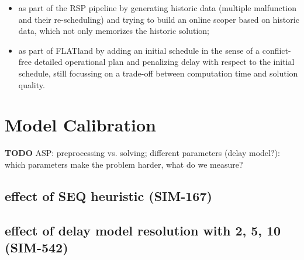 \documentclass{article}
\begin{document}
\begin{description}
\begin{itemize}
\item as part of the RSP pipeline by generating historic data (multiple malfunction and their re-scheduling) and trying to build an online scoper based on historic data, which not only memorizes the historic solution;
\item as part of FLATland by adding an initial schedule in the sense of a conflict-free detailed operational plan and penalizing delay with respect to the initial schedule, still focussing on a trade-off between computation time and solution quality.
\end{itemize}

\end{description}





\appendix



\section{Model Calibration}\label{subsec:model_calibration}

\begin{mdframed}
{\bf TODO} ASP: preprocessing vs. solving; different parameters (delay model?): which parameters make the problem harder, what do we measure?
\end{mdframed}

\subsection{effect of SEQ heuristic (SIM-167)}

\subsection{effect of delay model resolution with 2, 5, 10 (SIM-542)}
\end{document}
